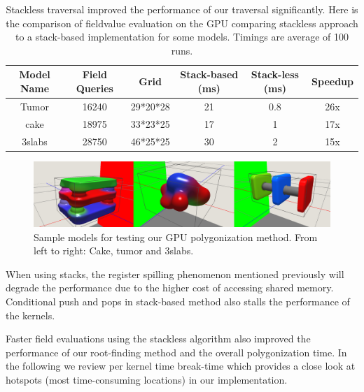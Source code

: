 \begin{table}[H]
\begin{center}
	 \caption{\label{table:stackless}
  {Stackless \blob traversal improved the performance of our \blob traversal significantly.
  Here is the comparison of fieldvalue evaluation on the GPU comparing stackless approach to a stack-based implementation for 
  some models. Timings are average of 100 runs.}
}
  \begin{tabular}{ | c | c | c | c | c | c |}
    \hline    
    Model Name & Field Queries & Grid & Stack-based (ms) & Stack-less (ms) & Speedup \\ \hline \hline
    Tumor & 16240 & 29*20*28 & 21 & 0.8 & 26x\\ \hline
    cake & 18975 & 33*23*25 & 17 & 1 & 17x\\ \hline
    3slabs & 28750 & 46*25*25 & 30 & 2 & 15x \\ \hline
    \hline
  \end{tabular}
\end{center}
\end{table}


\begin{figure}[H]
  \centering
  \includegraphics[width=1.0\linewidth]{figures/gpupoly/combined_models.png}
  \caption{\label{fig:combinedmodels}
  {Sample models for testing our GPU polygonization method. From left to right: Cake, tumor and 3slabs.}
}
\end{figure}

When using stacks, the register spilling phenomenon mentioned previously will degrade the performance due to the higher cost of accessing 
shared memory. Conditional push and pops in stack-based method also stalls the performance of the kernels.  

Faster field evaluations using the stackless algorithm also improved the performance of our root-finding method and the overall
polygonization time. In the following we review per kernel time break-time which provides a close look at hotspots (most time-consuming 
locations) in our implementation. 

